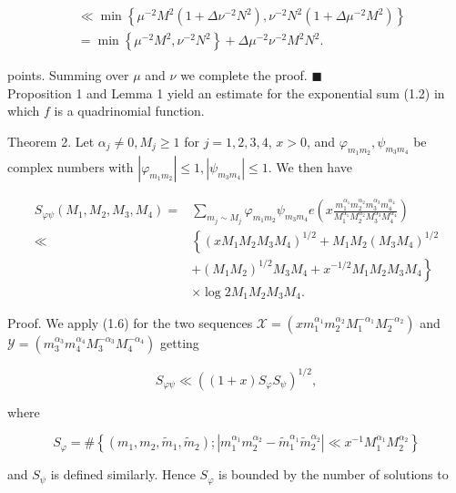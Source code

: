 \documentclass[10pt]{article}
\newcommand{\proofend}{\hfill\(\blacksquare\)}
\begin{document}
$$
\begin{aligned}
& \ll \min\left\{\mu^{-2}M^{2}\left(1+\Delta\nu^{-2}N^{2}\right),
\nu^{-2}N^{2}\left(1+\Delta\mu^{-2}M^{2}\right)\right\} \\
& =\min\left\{\mu^{-2}M^{2},\nu^{-2}N^{2}\right\}
  +\Delta\mu^{-2}\nu^{-2}M^{2}N^{2}.
\end{aligned}
$$

points. Summing over $\mu$ and $\nu$ we complete the proof. \proofend\\
Proposition 1 and Lemma 1 yield an estimate for the exponential sum (1.2) in which $f$ is a quadrinomial function.

Theorem 2. Let $\alpha_{j} \neq 0, M_{j} \geqslant 1$ for $j=1,2,3,4$, $x>0$, and $\varphi_{m_{1} m_{2}}, \psi_{m_{3} m_{4}}$ be complex numbers with $\left|\varphi_{m_{1}m_{2}}\right| \leqslant 1,\left|\psi_{m_{3} m_{4}}\right| \leqslant 1$. We then have

$$
\begin{aligned}
S_{\varphi\psi}\left(M_{1}, M_{2}, M_{3}, M_{4}\right)= & \sum_{m_{j} \sim M_{j}} \varphi_{m_{1} m_{2}} \psi_{m_{3} m_{4}} e\left(x \frac{m_{1}^{\alpha_{1}} m_{2}^{\alpha_{2}} m_{3}^{\alpha_{3}} m_{4}^{\alpha_{4}}}{M_{1}^{\alpha_{1}} M_{2}^{\alpha_{2}} M_{3}^{\alpha_{3}} M_{4}^{\alpha_{4}}}\right) \\
\ll & \left\{\left(x M_{1} M_{2} M_{3} M_{4}\right)^{1 / 2}+M_{1} M_{2}\left(M_{3} M_{4}\right)^{1 / 2}\right. \\
& \left.+\left(M_{1} M_{2}\right)^{1 / 2} M_{3} M_{4}+x^{-1 / 2} M_{1} M_{2} M_{3} M_{4}\right\} \\
& \times \log 2 M_{1} M_{2} M_{3} M_{4} .
\end{aligned}
$$

Proof. We apply (1.6) for the two sequences $\mathscr{X}=\left(x m_{1}^{\alpha_{1}} m_{2}^{\alpha_{2}} M_{1}^{-\alpha_{1}} M_{2}^{-\alpha_{2}}\right)$ and $\mathscr{Y}=\left(m_{3}^{\alpha_{3}} m_{4}^{\alpha_{4}} M_{3}^{-\alpha_{3}} M_{4}^{-\alpha_{4}}\right)$ getting

$$
S_{\varphi\psi} \ll\left((1+x) S_{\varphi} S_{\psi}\right)^{1 / 2},
$$

where

$$
S_{\varphi}=\#\left\{\left(m_{1}, m_{2}, \tilde{m}_{1}, \tilde{m}_{2}\right) ;\left|m_{1}^{\alpha_{1}} m_{2}^{\alpha_{2}}-\tilde{m}_{1}^{\alpha_{1}} \tilde{m}_{2}^{\alpha_{2}}\right| \ll x^{-1} M_{1}^{\alpha_{1}} M_{2}^{\alpha_{2}}\right\}
$$

and $S_{\psi}$ is defined similarly. Hence $S_{\varphi}$ is bounded by the number of solutions to
\end{document}
